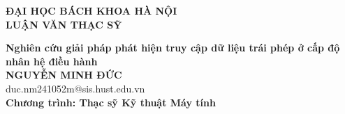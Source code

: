 \documentclass[main.tex]{subfiles}
\begin{document}
\begin{titlepage}
  \thispagestyle{empty}
  \begin{center}

    {\textbf{\large{ĐẠI HỌC BÁCH KHOA HÀ NỘI}}}\\[4cm]

    {\textbf{\huge{LUẬN VĂN THẠC SỸ}}}\\[1cm]
    {\textbf{\Large{Nghiên cứu giải pháp phát hiện truy cập dữ liệu trái phép
      ở cấp độ nhân hệ điều hành}}\\[1cm]

      {\textbf{\large{NGUYỄN MINH ĐỨC}}}\\
      {\large{duc.nm241052m@sis.hust.edu.vn}}\\[0.5cm]

      {\textbf{\large{Chương trình: Thạc sỹ Kỹ thuật Máy tính
      }}}\\

      \vspace{2cm}
      \begin{table}[H]
        \centering
    \end{table}}
  \end{center}

\end{titlepage}
\end{document}
